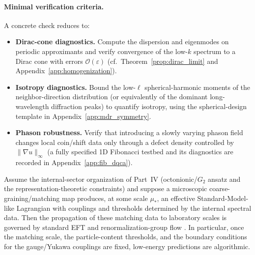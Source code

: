 \paragraph{Minimal verification criteria.}
A concrete check reduces to:
\begin{itemize}
    \item \textbf{Dirac-cone diagnostics.} Compute the dispersion and eigenmodes on periodic approximants and verify convergence of the low-$k$ spectrum to a Dirac cone with errors $\mathcal{O}(\varepsilon)$ (cf.\ Theorem~\ref{prop:dirac_limit} and Appendix~\ref{app:homogenization}).
    \item \textbf{Isotropy diagnostics.} Bound the low-$\ell$ spherical-harmonic moments of the neighbor-direction distribution (or equivalently of the dominant long-wavelength diffraction peaks) to quantify isotropy, using the spherical-design template in Appendix~\ref{app:mdr_symmetry}.
    \item \textbf{Phason robustness.} Verify that introducing a slowly varying phason field changes local coin/shift data only through a defect density controlled by $\|\nabla u\|_\infty$ (a fully specified 1D Fibonacci testbed and its diagnostics are recorded in Appendix~\ref{app:fib_dqca}).
\end{itemize}

\begin{conjecture}
\label{conj:eft_matching}
Assume the internal-sector organization of Part~IV (octonionic/$G_2$ ansatz and the representation-theoretic constraints) and suppose a microscopic coarse-graining/matching map produces, at some scale $\mu_\ast$, an effective Standard-Model-like Lagrangian with couplings and thresholds determined by the internal spectral data. Then the propagation of these matching data to laboratory scales is governed by standard EFT and renormalization-group flow \cite{PeskinSchroeder1995}. In particular, once the matching scale, the particle-content thresholds, and the boundary conditions for the gauge/Yukawa couplings are fixed, low-energy predictions are algorithmic.\par
\end{conjecture}

